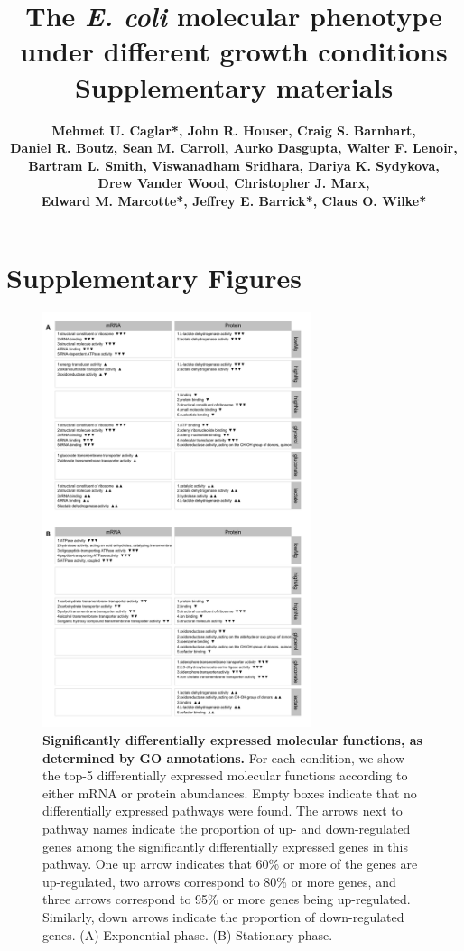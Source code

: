 \documentclass[a4paper]{article}
\title{\huge\bfseries \vspace{2cm} The \textit{E. coli} molecular phenotype under different growth conditions \\ \vspace{0.7cm}
	\Large\bfseries Supplementary materials \vspace{1.3cm}}
\author{
	\large\bfseries Mehmet U. Caglar*, John R. Houser, Craig S. Barnhart, \\
	\large\bfseries Daniel R. Boutz, Sean M. Carroll, Aurko Dasgupta, Walter F. Lenoir,\\ 
	\large\bfseries Bartram L. Smith, Viswanadham Sridhara, Dariya K. Sydykova, \\
	\large\bfseries Drew Vander Wood, Christopher J. Marx, \\
	\large\bfseries Edward M. Marcotte*, Jeffrey E. Barrick*, Claus O. Wilke*}
\begin{document}
\maketitle
\newpage
	

\listoffigures


\newpage

\section*{Supplementary Figures}

\begin{figure}[!htb]
\centerline{	\includegraphics[width=0.7\textwidth]{../../d_figures/resultTable_mf.png}
}
	\caption[Significantly differentially expressed molecular functions]
	{\textbf{Significantly differentially expressed molecular functions, as determined by GO annotations.} For each condition, we show the top-5 differentially expressed molecular functions according to either mRNA or protein abundances.  Empty boxes indicate that no differentially expressed pathways were found. The arrows next to pathway names indicate the proportion of up- and down-regulated genes among the significantly differentially expressed genes in this pathway. One up arrow indicates that 60\% or more of the genes are up-regulated, two arrows correspond to 80\% or more genes, and three arrows correspond to 95\% or more genes being up-regulated. Similarly, down arrows indicate the proportion of down-regulated genes. (A) Exponential phase. (B) Stationary phase.}
\end{figure}
\end{document}
